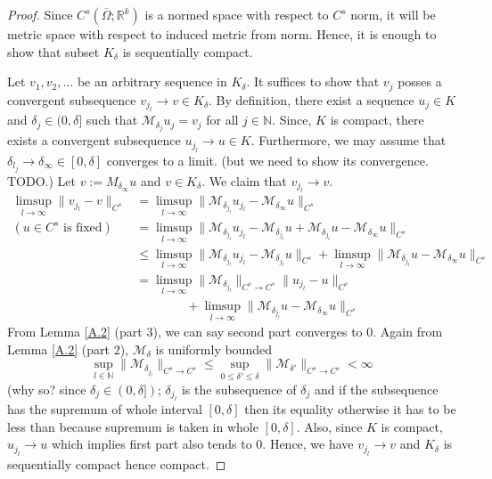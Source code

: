 \documentclass[reqno]{amsart}
\theoremstyle{plain}
\theoremstyle{definition}
\newcommand{\bb}[1]{\mathbb{#1}}
\newcommand{\cal}[1]{\mathcal{#1}}
\begin{document}
\begin{proof}
    Since $C^s(\overline{\Omega};\mathbb{R}^k)$ is a normed space with respect to $C^s$ norm, it will be metric space with respect to induced metric from norm. Hence, it is enough to show that subset $K_\delta$ is sequentially compact.

    Let $v_1, v_2, \dots$ be an arbitrary sequence in $K_\delta$. It suffices to show that $v_j$ posses a convergent subsequence $v_{j_l} \to v \in K_\delta$. By definition, there exist a sequence $u_j \in K$ and $\delta_j \in (0,\delta]$ such that $\cal M_{\delta_j}u_j = v_j$ for all $j \in \bb N$. Since, $K$ is compact, there exists a convergent subsequence $u_{j_l} \to u \in K$. Furthermore, we may assume that $\delta_{l_j} \to \delta_\infty \in [0,\delta]$ converges to a limit. (but we need to show its convergence. TODO.) Let $v := M_{\delta_\infty}u$ and $v \in K_\delta$. We claim that $v_{j_l} \to v$. 
    $$ \begin{aligned}
        \limsup\limits_{l \to \infty} \|v_{j_l} - v\|_{C^s} &= \limsup\limits_{l \to \infty} \|\cal M_{\delta_{j_l}}u_{j_l} - \cal M_{\delta_{\infty}}u\|_{C^s}\\
        (\text{$u \in C^s$ is fixed}) &=  \limsup\limits_{l \to \infty} \|\cal M_{\delta_{j_l}}u_{j_l} - \cal M_{\delta_{j_l}}u + \cal M_{\delta_{j_l}}u - \cal M_{\delta_{\infty}}u\|_{C^s} \\
        &\leq \limsup\limits_{l \to \infty} \|\cal M_{\delta_{j_l}}u_{j_l} - \cal M_{\delta_{j_l}}u\|_{C^s} + \limsup\limits_{l \to \infty} \|\cal M_{\delta_{j_l}}u - \cal M_{\delta_{\infty}}u\|_{C^s} \\
        &= \limsup\limits_{l \to \infty} \|\cal M_{\delta_{j_l}}\|_{C^s \to C^s} \|u_{j_l} - u\|_{C^s}\\ &\qquad\qquad+ \limsup\limits_{l \to \infty} \|\cal M_{\delta_{j_l}}u - \cal M_{\delta_{\infty}}u\|_{C^s}
    \end{aligned}
    $$
    From Lemma \ref{A.2} (part $3$), we can say second part converges to $0$. Again from Lemma \ref{A.2} (part $2$), $\cal M_\delta$ is uniformly bounded 
    $$ \sup_{l\in \bb N}\|\cal M_{\delta_{j_l}}\|_{C^s \to C^s} \leq \sup_{0 \leq \delta' \leq \delta}\|\cal M_{\delta'}\|_{C^s \to C^s} < \infty $$ (why so? since $\delta_j \in (0,\delta])$; $\delta_{j_l}$ is the subsequence of $\delta_j$ and if the subsequence has the supremum of whole interval $[0,\delta]$ then its equality otherwise it has to be less than because supremum is taken in whole $[0,\delta]$. Also, since $K$ is compact, $u_{j_l} \to u$ which implies first part also tends to $0$. Hence, we have $v_{j_l} \to v$ and $K_\delta$ is sequentially compact hence compact. 
\end{proof}
\end{document}
